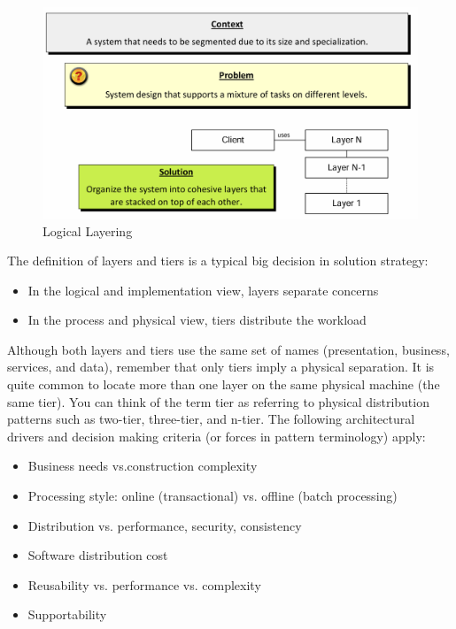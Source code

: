 \documentclass[../Main.tex]{subfiles}
\begin{document}
\begin{figure}[H]
    \centering
    \includegraphics[width=0.75\linewidth]{Images/logicallayering.png}
    \caption{Logical Layering}
\end{figure}

The definition of layers and tiers is a typical
big decision in solution strategy:
\begin{itemize}
    \item In the logical and implementation view,
    layers separate concerns
    \item In the process and physical view,
    tiers distribute the workload
\end{itemize}


Although both layers and tiers use the same set of names 
(presentation, business, services, and data), 
remember that only tiers imply a physical separation.
It is quite common to locate more than one layer on the
same physical machine (the same tier). You can think of
the term tier as referring to physical distribution
patterns such as two-tier, three-tier, and n-tier.
The following architectural drivers and decision making criteria (or forces in pattern terminology) apply:
\begin{itemize}
    \item Business needs vs.construction complexity
    \item Processing style: online (transactional) vs. offline (batch processing)
    \item Distribution vs. performance, security, consistency
    \item Software distribution cost
    \item Reusability vs. performance vs. complexity
    \item Supportability
\end{itemize}
\end{document}
